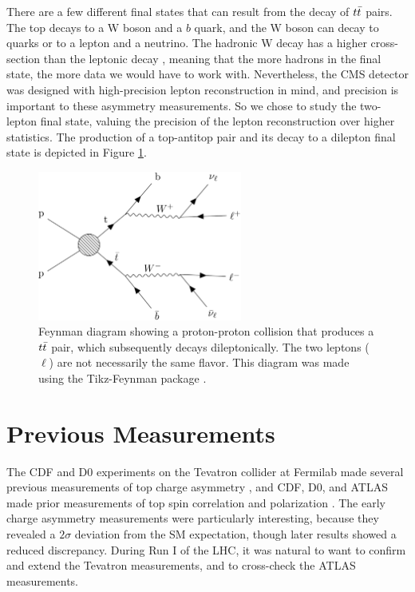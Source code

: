 There are a few different final states that can result from the decay
of $\ttbar$ pairs. The top decays to a W boson and a $b$ quark, and
the W boson can decay to quarks or to a lepton and a neutrino. The
hadronic W decay has a higher cross-section than the leptonic decay \cite{pdg},
meaning that the more hadrons in the final state, the more data we
would have to work with. Nevertheless, the CMS detector was designed
with high-precision lepton reconstruction in mind, and precision is
important to these asymmetry measurements. So we chose to study the two-lepton
final state, valuing the precision of the lepton reconstruction over
higher statistics. The production of a top-antitop pair and its decay
to a dilepton final state is depicted in Figure
\ref{fig:afb:feynmandiagram}.

\begin{figure}
\centering
\includegraphics[width=0.6\textwidth]{figures/feynmandiagram_afb.pdf}
\caption[Feynman diagram showing a proton-proton collision that
  produces a $\ttbar$ pair, which subsequently decays
  dileptonically. The two leptons ($\ell$) are not necessarily the
  same flavor.]
  {Feynman diagram showing a proton-proton collision that produces
  a $\ttbar$ pair, which subsequently decays dileptonically. The two
  leptons ($\ell$) are not necessarily the same flavor. This
  diagram was made using the Tikz-Feynman package \cite{tikzfeynman}.}
\label{fig:afb:feynmandiagram}
\end{figure}

\section{Previous Measurements}
\label{sec:afb:tevatron}

The CDF and D0 experiments on the Tevatron collider at Fermilab made
several previous measurements of top charge asymmetry
\cite{cdfchargeasym1,d0chargeasym1, cdfchargeasym2,d0chargeasym2}, and
CDF, D0, and ATLAS made prior measurements of top spin correlation and
polarization
\cite{cdfspincorr,d0spincorr1,d0spincorr2,d0pol,atlaspol,atlasspincorr}. The
early charge asymmetry measurements
\cite{cdfchargeasym1,d0chargeasym1} were particularly interesting,
because they revealed a $2\sigma$ deviation from the SM expectation,
though later results \cite{cdfchargeasym2,d0chargeasym2} showed a
reduced discrepancy. During Run I of the LHC, it was natural to want to
confirm and extend the Tevatron measurements, and to cross-check the
ATLAS measurements.

